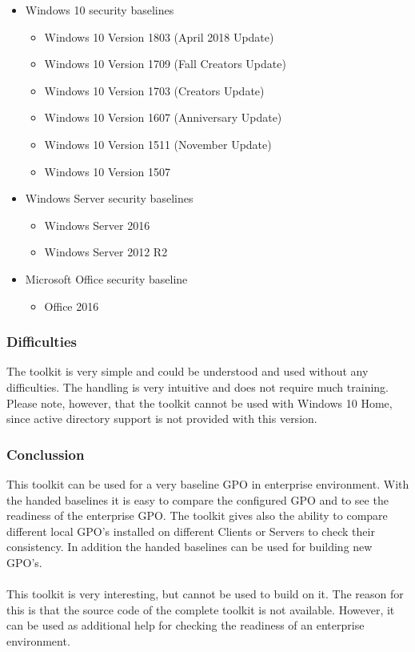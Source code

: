 \begin{itemize}
    \item Windows 10 security baselines
    \begin{itemize}
        \item Windows 10 Version 1803 (April 2018 Update)
        \item Windows 10 Version 1709 (Fall Creators Update)
        \item Windows 10 Version 1703 (Creators Update)
        \item Windows 10 Version 1607 (Anniversary Update)
        \item Windows 10 Version 1511 (November Update)
        \item Windows 10 Version 1507
    \end{itemize}
    \item Windows Server security baselines
    \begin{itemize}
        \item Windows Server 2016
        \item Windows Server 2012 R2
    \end{itemize}
    \item Microsoft Office security baseline
    \begin{itemize}
        \item Office 2016
    \end{itemize}
\end{itemize}

\subsubsection{Difficulties}
The toolkit is very simple and could be understood and used without any difficulties. The handling is very intuitive and does not require much training. Please note, however, that the toolkit cannot be used with Windows 10 Home, since active directory support is not provided with this version.

\subsubsection{Conclussion}
This toolkit can be used for a very baseline GPO in enterprise environment. With the handed baselines it is easy to compare the configured GPO and to see the readiness of the enterprise GPO. The toolkit gives also the ability to compare different local GPO's installed on different Clients or Servers to check their consistency. In addition the handed baselines can be used for building new GPO's.
\\\\
This toolkit is very interesting, but cannot be used to build on it. The reason for this is that the source code of the complete toolkit is not available. However, it can be used as additional help for checking the readiness of an enterprise environment.

